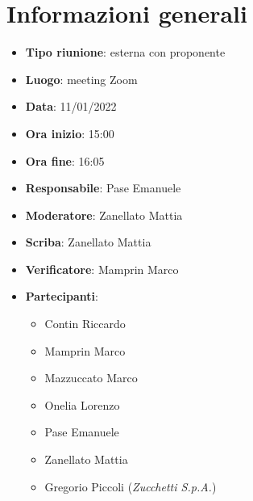 \section{Informazioni generali}
\begin{itemize}
  \item \textbf{Tipo riunione}: esterna con proponente
  \item \textbf{Luogo}: meeting Zoom
  \item \textbf{Data}: 11/01/2022
  \item \textbf{Ora inizio}: 15:00
  \item \textbf{Ora fine}: 16:05
  \item \textbf{Responsabile}: Pase Emanuele
  \item \textbf{Moderatore}: Zanellato Mattia
  \item \textbf{Scriba}: Zanellato Mattia
  \item \textbf{Verificatore}: Mamprin Marco
  \item \textbf{Partecipanti}:
  \begin{itemize}
    \item Contin Riccardo
    \item Mamprin Marco
    \item Mazzuccato Marco
    \item Onelia Lorenzo
    \item Pase Emanuele
    \item Zanellato Mattia
    \item Gregorio Piccoli (\textit{Zucchetti S.p.A.})
  \end{itemize}
\end{itemize}
